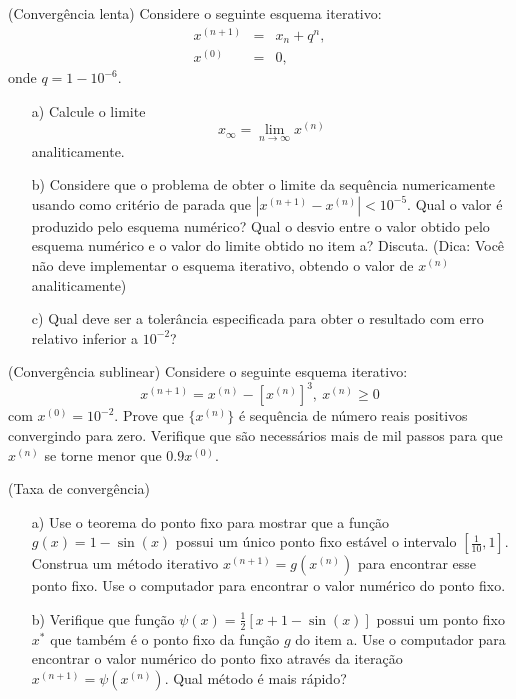 \begin{ex}
\begin{exer}(Convergência lenta) Considere o seguinte esquema iterativo:
  \begin{eqnarray}
    x^{(n+1)} &=& x_n+q^n,\\
    x^{(0)} &=& 0,
  \end{eqnarray}
onde $q=1-10^{-6}$.
\begin{itemize}
\item[a)] Calcule o limite \begin{equation} x_\infty=\lim_{n\to\infty}x^{(n)} \end{equation} analiticamente.
\item[b)] Considere que o problema de obter o limite da sequência numericamente usando como critério de parada que $|x^{(n+1)}-x^{(n)}|<10^{-5}$. Qual o valor é produzido pelo esquema numérico? Qual o desvio entre o valor obtido pelo esquema numérico e o valor do limite obtido no item a?  Discuta. (Dica: Você não deve implementar o esquema iterativo, obtendo o valor de $x^{(n)}$ analiticamente)
\item[c)] Qual deve ser a tolerância especificada para obter o resultado com erro relativo inferior a $10^{-2}$?
\end{itemize}
\end{exer}

\begin{exer}(Convergência sublinear) Considere o seguinte esquema iterativo:
\begin{equation} x^{(n+1)}=x^{(n)}-[x^{(n)}]^3,\ x^{(n)}\geq 0 \end{equation}
com $x^{(0)}= 10^{-2}$.
Prove que $\{x^{(n)}\}$ é sequência de número reais positivos convergindo para zero. Verifique que são necessários mais de mil passos para que $x^{(n)}$ se torne menor que $0.9 x^{(0)}$.
\end{exer}


\begin{exer}(Taxa de convergência)
\begin{itemize}
\item[a)] Use o teorema do ponto fixo para mostrar que a função $g(x)=1-\sin(x)$ possui um único ponto fixo estável o intervalo $[\frac{1}{10},1]$. Construa um método iterativo $x^{(n+1)}=g(x^{(n)})$ para encontrar esse ponto fixo. Use o computador para encontrar o valor numérico do ponto fixo.
\item[b)] Verifique que função $\psi(x)=\frac{1}{2}\left[x+1-\sin(x)\right]$ possui um ponto fixo $x^*$ que também é o ponto fixo da função $g$ do item a. Use o computador para encontrar o valor numérico do ponto fixo através da iteração $x^{(n+1)}=\psi(x^{(n)})$. Qual método é mais rápido?
\end{itemize}
\end{exer}



\end{ex}
